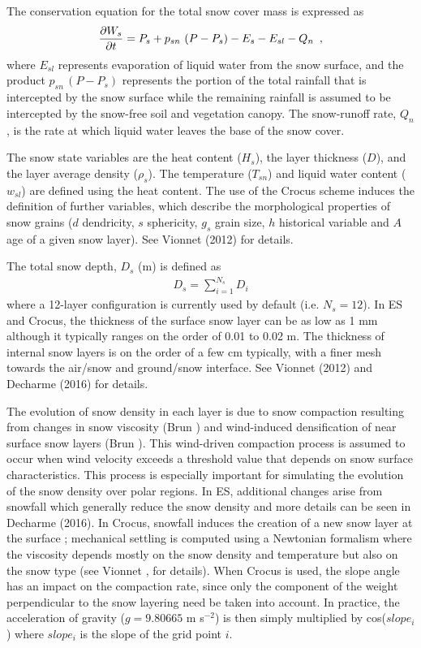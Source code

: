 The conservation equation for the total snow cover mass
is expressed as
%
\begin{eqnarray}
{\partial W_s \over \partial t} =
P_s + p_{sn}\,\left(P-P_s\right) - E_{s} - E_{sl} - Q_n
\,\,\,,
\end{eqnarray}
%
where $E_{sl}$ represents evaporation of liquid water
from the snow surface, and the product $p_{sn}\,\left(P-P_s\right)$
represents the portion of the total rainfall that is
intercepted by the snow surface while the remaining
rainfall is assumed to be intercepted by the snow-free soil and vegetation
canopy. The snow-runoff rate, $Q_n$,
is the rate at which
liquid water leaves the base of the snow cover.


The snow state variables are the heat content ($H_s$),
the layer thickness ($D$), and the layer average density ($\rho_s$).
The temperature ($T_{sn}$) and liquid water content ($w_{sl}$) are defined
using the heat content.
The use of the Crocus scheme induces the definition of further variables, 
which describe the morphological properties of snow grains ($d$ dendricity, $s$ sphericity, 
$g_s$ grain size, $h$ historical variable and $A$ age of a given snow layer). 
See Vionnet \etal (2012) for details.

The total snow depth, $D_s$ (m) is defined as
%
\begin{eqnarray}
D_s = \sum_{i=1}^{N_s} D_i
\end{eqnarray}
%
where a 12-layer configuration is currently used by default (i.e. $N_s=12$). 
In ES and Crocus, the thickness of the surface snow layer can be
as low as 1 mm although it typically ranges on the order of 0.01 to 0.02 m.
The thickness of internal snow layers is on the order of a
few cm typically, with a finer mesh towards the air/snow and
ground/snow interface. See Vionnet \etal (2012) and Decharme \etal
(2016) for details.

The evolution of snow density in each layer is due to snow compaction
resulting from changes in snow viscosity (Brun ) and
wind-induced densification of near surface snow layers  
(Brun ). This wind-driven compaction process is assumed to occur
when wind velocity exceeds a threshold value that depends on snow
surface characteristics. This process is especially important for
simulating the evolution of the snow density over polar regions. 
%
In ES, additional changes arise from snowfall which generally reduce the
snow density and more details can be seen in Decharme \etal (2016). In
Crocus, snowfall induces the creation of a new snow layer at the
surface ; mechanical settling is computed using a Newtonian formalism
where the viscosity depends mostly on the snow density and temperature
but also on the snow type (see Vionnet , for
details). When Crocus is used, the slope angle has an impact on the
compaction rate, since only the component of the weight perpendicular
to the snow layering need be taken into account. In practice, the
acceleration of gravity ($g=9.80665$ m s$^{−2}$) is then simply multiplied
by cos($slope_i$) where $slope_i$ is the slope of the grid point $i$.

